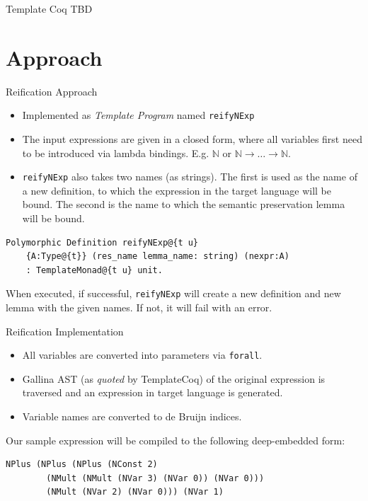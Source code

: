 \documentclass[aspectratio=169]{beamer}
\newcommand{\N}{\mathbb{N}}
\begin{document}
\begin{frame}{Template Coq}
  TBD
\end{frame}

\section{Approach}

\begin{frame}[fragile]{Reification Approach}
  
  \begin{itemize}
  \item Implemented as \textit{Template Program} named \lstinline[language=Coq]{reifyNExp}
  \item The input expressions are given in a closed form, where all
    variables first need to be introduced via lambda
    bindings. E.g. $\mathbb{N}$ or
    $\N \rightarrow \ldots \rightarrow \N$.
  \item \lstinline[language=Coq]{reifyNExp} also takes two names (as strings). The first
    is used as the name of a new definition, to which the expression
    in the target language will be bound. The second is the name to
    which the semantic preservation lemma will be bound.
  \end{itemize}

  \begin{lstlisting}[language=Coq, mathescape=true, frame=single]
  Polymorphic Definition reifyNExp@{t u}
    {A:Type@{t}} (res_name lemma_name: string) (nexpr:A)
    : TemplateMonad@{t u} unit.
  \end{lstlisting}

  When executed, if successful, \lstinline[language=Coq]{reifyNExp} will create a new
  definition and new lemma with the given names. If not, it will fail
  with an error. 

\end{frame}


\begin{frame}[fragile]{Reification Implementation}
  
  \begin{itemize}
  \item All variables are converted into parameters via \lstinline[language=Coq]{forall}.
  \item Gallina AST (as \textit{quoted} by TemplateCoq) of the
    original expression is traversed and an expression in target
    language is generated.
  \item Variable names are converted to de Bruijn indices.
  \end{itemize}
  \medskip
  Our sample expression will be compiled to the following
  deep-embedded form:
  
    \begin{lstlisting}[language=Coq, mathescape=true,frame=single]
    NPlus (NPlus (NPlus (NConst 2)
        (NMult (NMult (NVar 3) (NVar 0)) (NVar 0)))
        (NMult (NVar 2) (NVar 0))) (NVar 1)
  \end{lstlisting}

\end{frame}
\end{document}
